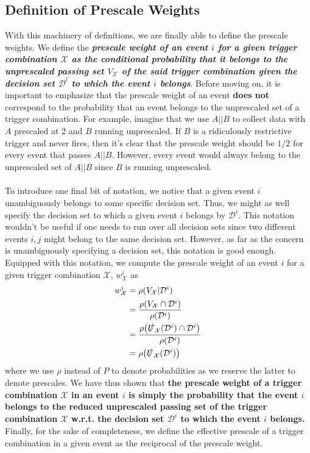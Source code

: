 \subsection{Definition of Prescale Weights}
With this machinery of definitions, we are finally able to define the prescale weights. We define the \emph{\textbf{prescale weight of an event $i$ for a given trigger combination $\mathcal{X}$ as the conditional probability that it belongs to the unprescaled passing set $V_\mathcal{X}$ of the said trigger combination given the decision set $\mathcal{D}^l$ to which the event $i$ belongs}}. Before moving on, it is important to emphasize that the prescale weight of an event \textbf{does not} correspond to the probability that an event belongs to the unprescaled set of a trigger combination. For example, imagine that we use $A\vert\vert B$ to collect data with $A$ prescaled at 2 and $B$ running unprescaled. If $B$ is a ridiculously restrictive trigger and never fires, then it's clear that the prescale weight should be $1/2$ for every event that passes $A\vert\vert B$. However, every event would always belong to the unprescaled set of $A\vert\vert B$ since $B$ is running unprescaled. \\\\
To introduce one final bit of notation, we notice that a given event $i$ unambiguously belongs to some specific decision set. Thus, we might as well specify the decision set to which a given event $i$ belongs by $\mathcal{D}^i$. This notation wouldn't be useful if one needs to run over all decision sets since two different events $i,j$ might belong to the same decision set. However, as far as the concern is unambiguously specifying a decision set, this notation is good enough. Equipped with this notation, we compute the prescale weight of an event $i$ for a given trigger combination $\mathcal{X}$, $w_{\mathcal{X}}^i$ as 
\begin{align}
\label{eq:prescale-weight-def}
    w_{\mathcal{X}}^i&=\rho(V_\mathcal{X} \vert \mathcal{D}^{i})\\
    &=\frac{\rho(V_\mathcal{X}\cap \mathcal{D}^{i})}{\rho(\mathcal{D}^{i})}\\
    &=\frac{\rho\big(\slashed{U}_{\mathcal{X}}(\mathcal{D}^i)\cap \mathcal{D}^i\big)}{\rho(\mathcal{D}^{i})}\\
    &=\rho\big(\slashed{U}_{\mathcal{X}}(\mathcal{D}^i)\big)
\end{align}
where we use $\rho$ instead of $P$ to denote probabilities as we reserve the latter to denote prescales. %
We have thus shown that \textbf{the prescale weight of a trigger combination $\mathcal{X}$ in an event $i$ is simply the probability that the event $i$ belongs to the reduced unprescaled passing set of the trigger combination $\mathcal{X}$ w.r.t. the decision set $\mathcal{D}^i$ to which the event $i$ belongs.} %
Finally, for the sake of completeness, we define the effective prescale of a trigger combination in a given event as the reciprocal of the prescale weight. 
